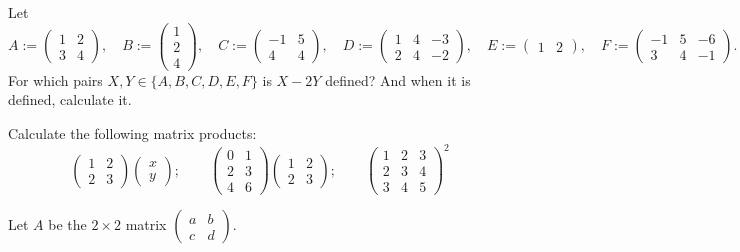 \documentclass[answers]{exam}
\begin{document}
\begin{questions}
\question%
Let \[
	A:=\begin{pmatrix}1 & 2 \\ 3 & 4\end{pmatrix},\quad
	B:=\begin{pmatrix}1 \\ 2 \\ 4\end{pmatrix},\quad
	C:=\begin{pmatrix}-1 & 5 \\ 4 & 4\end{pmatrix},\quad
	D:=\begin{pmatrix}1 & 4 & -3 \\ 2 & 4 & -2\end{pmatrix},\quad
	E:=\begin{pmatrix}1 & 2\end{pmatrix},\quad
	F:=\begin{pmatrix}-1 & 5 & -6 \\ 3 & 4 & -1\end{pmatrix}.
\] For which pairs $X, Y \in\{A, B, C, D, E, F\}$ is $X-2 Y$ defined? And when it is defined, calculate it.



\question%
Calculate the following matrix products: \[
	\begin{pmatrix}
		1 & 2 \\
		2 & 3
	\end{pmatrix}\begin{pmatrix}
		x \\
		y
	\end{pmatrix} ; \qquad\begin{pmatrix}
		0 & 1 \\
		2 & 3 \\
		4 & 6
	\end{pmatrix}\begin{pmatrix}
		1 & 2 \\
		2 & 3
	\end{pmatrix} ; \qquad\begin{pmatrix}
		1 & 2 & 3 \\
		2 & 3 & 4 \\
		3 & 4 & 5
	\end{pmatrix}^{2}
\]



\question%
Let $A$ be the $2 \times 2$ matrix $\begin{pmatrix}a & b \\ c & d\end{pmatrix}$.
\begin{parts}

\end{parts}
\end{questions}
\end{document}
